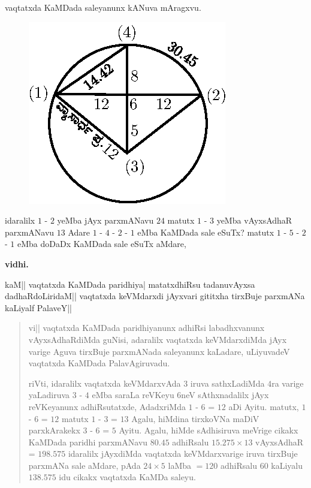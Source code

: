 vaqtatxda KaMDada saleyanunx kANuva mAragxvu.
\begin{figure}[H]
\centering
\includegraphics{figure/fig39.eps}
\end{figure}

idaralilx $1$ - $2$ yeMba jAyx parxmANavu $24$ matutx $1$ - $3$ yeMba
vAyxsAdhaR parxmANavu $13$ Adare $1$ - $4$ - $2$ - $1$ eMba KaMDada
sale eSuTx? matutx $1$ - $5$ - $2$ - $1$ eMba doDaDx KaMDada sale
eSuTx aMdare,

\begin{center}
{\bf vidhi.}
\end{center}

kaM|| vaqtatxda KaMDada paridhiya| matatxdhiRsu tadanuvAyxsa
dadhaRdoLiridaM|| vaqtatxda keVMdarxdi jAyxvari gititxha tirxBuje
parxmANa kaLiyalf PalaveY||

\begin{verse}
vi|| vaqtatxda KaMDada paridhiyanunx adhiRsi labadhxvanunx
vAyxsAdhaRdiMda guNisi, adaralilx vaqtatxda keVMdarxdiMda jAyx varige
Aguva tirxBuje parxmANada saleyanunx kaLadare, uLiyuvadeV vaqtatxda
KaMDada PalavAgiruvadu.

riVti, idaralilx vaqtatxda keVMdarxvAda $3$ iruva sathxLadiMda $4$ra
varige yaLadiruva $3$ - $4$ eMba saraLa reVKeyu $6$neV sAthxnadalilx
jAyx reVKeyanunx adhiRsutatxde, AdadxriMda $1$ - $6$ = $12$ aDi
Ayitu. matutx, $1$ - $6$ = $12$ matutx $1$ - $3$ = $13$ Agalu, hiMdina
tirxkoVNa maDiV parxkArakekx $3$ - $6$ = $5$ Ayitu. Agalu, hiMde
sAdhisiruva meVrige cikakx KaMDada paridhi parxmANavu $80.45$
adhiRsalu $15.275\times 13$ vAyxsAdhaR = $198.575$ idaralilx jAyxdiMda
vaqtatxda keVMdarxvarige iruva tirxBuje parxmANa sale aMdare, pAda
$24\times 5$ laMba $=120$ adhiRsalu $60$ kaLiyalu $138.575$ idu cikakx
vaqtatxda KaMDa saleyu.
\end{verse}

